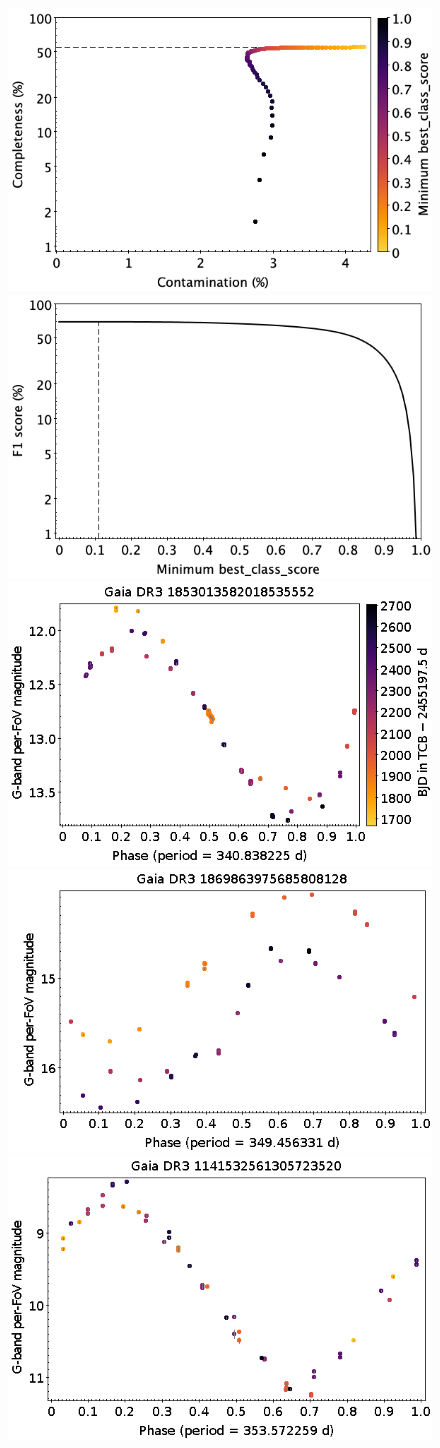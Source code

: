 \documentclass[longauth]{aa}
\begin{document}
\begin{appendix}
\begin{figure}
\centering
{} \includegraphics[width=0.45\hsize]{figures/appendix/LPV_cls_scc.png}  
\hspace{2mm}
 \includegraphics[width=0.45\hsize]{figures/appendix/LPV_cls_sf1.png} \\  
\vspace{4mm}
 \includegraphics[width=0.45\hsize]{figures/appendix/C-rich_LPV-46.png}  
\hspace{2mm}
 \includegraphics[width=0.45\hsize]{figures/appendix/C-rich_LPV-55.png} \\
\vspace{4mm}
 \includegraphics[width=0.45\hsize]{figures/appendix/O-rich_LPV-11.png}  

\end{figure}
\end{appendix}
\end{document}
